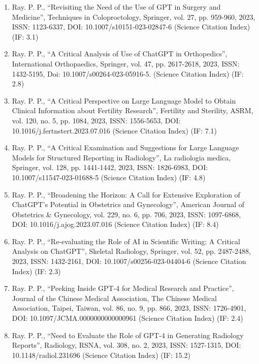 \documentclass[11pt,a4paper]{moderncv}
\begin{document}
\begin{adjustwidth}{6em}{0pt}
\begin{enumerate}
		\item Ray. P. P., “Revisiting the Need of the Use of GPT in Surgery and Medicine”, Techniques in Coloproctology, Springer, vol. 27, pp. 959-960, 2023, ISSN: 1123-6337, DOI: 10.1007/s10151-023-02847-6 (Science Citation Index) (IF: 3.1)
		
		\item Ray. P. P., “A Critical Analysis of Use of ChatGPT in Orthopedics”, International Orthopaedics, Springer, vol. 47, pp. 2617-2618, 2023, ISSN: 1432-5195, Doi: 10.1007/s00264-023-05916-5. (Science Citation Index) (IF: 2.8)
		
		\item Ray. P. P., “A Critical Perspective on Large Language Model to Obtain Clinical Information about Fertility Research”, Fertility and Sterility, ASRM, vol. 120, no. 5, pp. 1084, 2023, ISSN: 1556-5653, DOI: 10.1016/j.fertnstert.2023.07.016 (Science Citation Index) (IF: 7.1)
		
		\item Ray. P. P., “A Critical Examination and Suggestions for Large Language Models for Structured Reporting in Radiology”, La radiologia medica, Springer, vol. 128, pp. 1441-1442, 2023, ISSN: 1826-6983, DOI: 10.1007/s11547-023-01688-5 (Science Citation Index) (IF: 4.8)
		
		\item Ray. P. P., “Broadening the Horizon: A Call for Extensive Exploration of ChatGPT's Potential in Obstetrics and Gynecology”, American Journal of Obstetrics \& Gynecology, vol. 229, no. 6, pp. 706, 2023, ISSN: 1097-6868, DOI: 10.1016/j.ajog.2023.07.016 (Science Citation Index) (IF: 8.4)
		
		\item Ray. P. P., “Re-evaluating the Role of AI in Scientific Writing: A Critical Analysis on ChatGPT”, Skeletal Radiology, Springer, vol. 52, pp. 2487-2488, 2023, ISSN: 1432-2161, DOI: 10.1007/s00256-023-04404-6 (Science Citation Index) (IF: 2.3)
		
		\item Ray. P. P., “Peeking Inside GPT-4 for Medical Research and Practice”, Journal of the Chinese Medical Association, The Chinese Medical Association, Taipei, Taiwan, vol. 86, no. 9, pp. 866, 2023, ISSN: 1726-4901, DOI: 10.1097/JCMA.0000000000000961 (Science Citation Index) (IF: 2.4)
		
		\item Ray. P. P., “Need to Evaluate the Role of GPT-4 in Generating Radiology Reports”, Radiology, RSNA, vol. 308, no. 2, 2023, ISSN: 1527-1315, DOI: 10.1148/radiol.231696 (Science Citation Index) (IF: 15.2)
		

\end{enumerate}
\end{adjustwidth}
\end{document}
